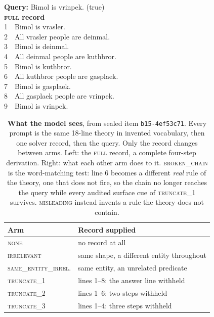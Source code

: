 \documentclass{article}
\begin{document}
\begin{table}[tb]
\centering\footnotesize
\caption{\textbf{What the model sees}, from sealed item \texttt{b15-4ef53c71}.
Every prompt is the same 18-line theory in invented vocabulary, then one solver
record, then the query. Only the record changes between arms. Left: the
\textsc{full} record, a complete four-step derivation. Right: what each other
arm does to it. \textsc{broken\_chain} is the word-matching test: line 6 becomes
a different \emph{real} rule of the theory, one that does not fire, so the chain
no longer reaches the query while every audited surface cue of
\textsc{truncate\_1} survives. \textsc{misleading} instead invents a rule the theory does not
contain.}
\label{tab:stimulus}
\begin{minipage}[t]{0.40\textwidth}
\vspace{0pt}
\ttfamily\scriptsize
\textrm{\textbf{Query:}} Bimol is vrinpek. \textrm{(true)}\\[3pt]
\textrm{\textbf{\textsc{full} record}}\\
1\ \ Bimol is vrasler.\\
2\ \ All vrasler people are deinmal.\\
3\ \ Bimol is deinmal.\\
4\ \ All deinmal people are kuthbror.\\
5\ \ Bimol is kuthbror.\\
6\ \ All kuthbror people are gasplaek.\\
7\ \ Bimol is gasplaek.\\
8\ \ All gasplaek people are vrinpek.\\
9\ \ Bimol is vrinpek.
\end{minipage}\hfill
\begin{minipage}[t]{0.58\textwidth}
\vspace{0pt}
\scriptsize
\begin{tabular}{@{}ll@{}}
\toprule
Arm & Record supplied \\
\midrule
\textsc{none}        & no record at all \\
\textsc{irrelevant}  & same shape, a different entity throughout \\
\textsc{same\_entity\_irrel.} & same entity, an unrelated predicate \\
\textsc{truncate\_1} & lines 1--8: the answer line withheld \\
\textsc{truncate\_2} & lines 1--6: two steps withheld \\
\textsc{truncate\_3} & lines 1--4: three steps withheld \\

\end{tabular}
\end{minipage}
\end{table}
\end{document}
